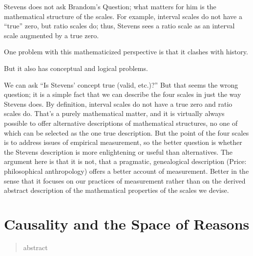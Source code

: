 \documentclass[11pt,twoside]{article}
\begin{document}
Stevens does not ask Brandom's Question; what matters for him is the
mathematical structure of the scales.  For example, interval scales do
not have a ``true'' zero, but ratio scales do; thus, Stevens sees
a ratio scale as an interval scale augmented by a true zero.

One problem with this mathematicized perspective is that it clashes
with history.

But it also has conceptual and logical problems.

We can ask ``Is Stevens' concept true (valid, etc.)?''  But that seems
the wrong question; it is a simple fact that we can describe the four
scales in just the way Stevens does.  By definition, interval scales
do not have a true zero and ratio scales do.  That's a purely
mathematical matter, and it is virtually always possible to offer
alternative descriptions of mathematical structures, no one of which
can be selected as the one true description.  But the point of the
four scales is to address issues of empirical measurement, so the
better question is whether the Stevens description is more
enlightening or useful than alternatives.  The argument here is that
it is not, that a pragmatic, genealogical description (Price:
philosophical anthropology) offers a better account of measurement.
Better in the sense that it focuses on our practices of measurement
rather than on the derived abstract description of the mathematical
properties of the scales we devise.

\section{Causality and the Space of Reasons}

\begin{abstract}
abstract
\end{abstract}

\noindent
\cite{abell_narrative_2004} \\
\cite{crane_mental_1995} \\
\cite{gross_pragmatist_2009} \\
\cite{jackson_mental_1996} \\
\cite{lowe_causal_1993} \\
\cite{lowe_non-cartesian_2006} \\
\cite{macdonald_mental_1986} \\
\cite{menzies_causation_1993} \\
\cite{morris_causes_1986} \\
\cite{williamson_broadness_1998}
\end{document}

